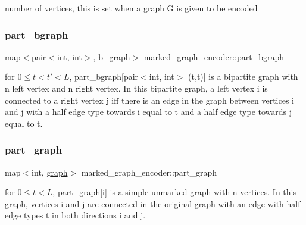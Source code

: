 number of vertices, this is set when a graph G is given to be encoded 

\mbox{\label{classmarked__graph__encoder_a5faebef707fb681c0b6c2ccf64abc04c}} 
\subsubsection{\texorpdfstring{part\+\_\+bgraph}{part\_bgraph}}
{\footnotesize\ttfamily map$<$pair$<$int, int$>$, \hyperlink{classb__graph}{b\+\_\+graph}$>$ marked\+\_\+graph\+\_\+encoder\+::part\+\_\+bgraph\hspace{0.3cm}{\ttfamily [private]}}



for $0 \leq t < t' < L$, part\+\_\+bgraph\mbox{[}pair$<$int, int$>$ (t,t\textquotesingle{})\mbox{]} is a bipartite graph with n left vertex and n right vertex. In this bipartite graph, a left vertex i is connected to a right vertex j iff there is an edge in the graph between vertices i and j with a half edge type towards i equal to t and a half edge type towards j equal to t\textquotesingle{}. 

\mbox{\label{classmarked__graph__encoder_adbafd0769ae301acc1b2c19b5e1d4844}} 
\subsubsection{\texorpdfstring{part\+\_\+graph}{part\_graph}}
{\footnotesize\ttfamily map$<$int, \hyperlink{classgraph}{graph}$>$ marked\+\_\+graph\+\_\+encoder\+::part\+\_\+graph\hspace{0.3cm}{\ttfamily [private]}}



for $0 \leq t < L$, part\+\_\+graph\mbox{[}i\mbox{]} is a simple unmarked graph with n vertices. In this graph, vertices i and j are connected in the original graph with an edge with half edge types t in both directions i and j. 

\mbox{\label{classmarked__graph__encoder_a08fdf6fcd7dcd8c5d1667f2d7ff06c2c}} 
